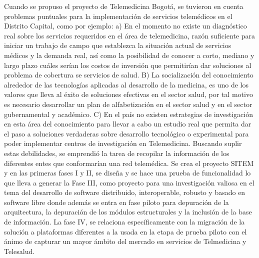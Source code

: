 Cuando se propuso el proyecto de Telemedicina Bogotá, se tuvieron en cuenta problemas puntuales para la implementación de servicios telemédicos en el Distrito Capital, como por ejemplo: a) En el momento no existe un diagnóstico real sobre los servicios requeridos en el área de telemedicina, razón suficiente para iniciar un trabajo de campo que establezca la situación actual de servicios médicos y la demanda real, así como la posibilidad de conocer a corto, mediano y largo plazo cuáles serían los costos de inversión que permitirían dar soluciones al problema  de cobertura se servicios de salud. B) La socialización del conocimiento alrededor de las tecnologías aplicadas al desarrollo de la medicina, es uno de los valores que lleva al éxito de soluciones efectivas en el sector salud, por tal motivo es necesario desarrollar un plan de alfabetización en el sector salud y en el sector gubernamental y académico. C) En el país no existen estrategias de investigación en esta área del conocimiento para llevar a cabo un estudio real que permita dar el paso a soluciones verdaderas sobre desarrollo tecnológico o experimental para poder implementar centros de investigación en Telemedicina.
Buscando suplir estas debilidades,  se emprendió la tarea de recopilar la información de los diferentes entes que conformarían una red telemédica. Se crea el proyecto SITEM y en las primeras fases I y II, se diseña y se hace una prueba de funcionalidad lo que lleva a generar la Fase III,  como proyecto para una investigación valiosa en el tema del desarrollo de software distribuido, interoperable, robusto y basado en software libre donde además se entra en fase piloto para depuración de la arquitectura, la depuración de los módulos estructurales y la inclusión de la base de información. La fase IV, se relaciona específicamente con la migración de la solución a plataformas diferentes a la usada en la etapa de prueba piloto con el ánimo de capturar un mayor ámbito del mercado en servicios de Telmedicina y Telesalud. 